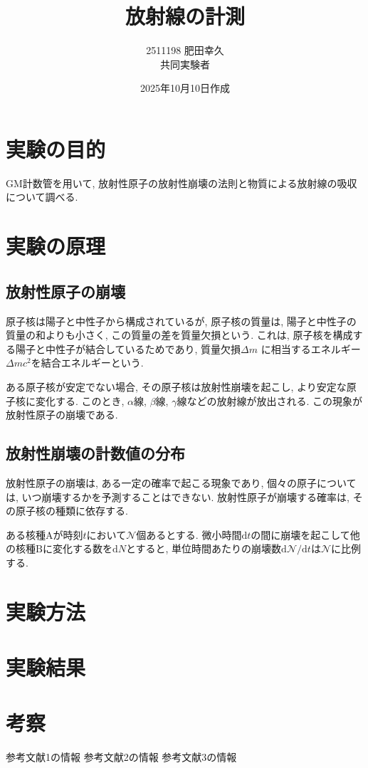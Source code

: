 \documentclass{jarticle}
\title{放射線の計測}
\author{2511198 肥田幸久 \\ 共同実験者 \\ }
\date{2025年10月10日作成}
\begin{document}
\maketitle


\section{実験の目的}

GM計数管を用いて, 放射性原子の放射性崩壊の法則と物質による放射線の吸収について調べる.


\section{実験の原理}

\subsection{放射性原子の崩壊}

原子核は陽子と中性子から構成されているが, 原子核の質量は, 陽子と中性子の質量の和よりも小さく, この質量の差を質量欠損という.
これは, 原子核を構成する陽子と中性子が結合しているためであり, 質量欠損$\Delta m$ に相当するエネルギー$\Delta mc^2$を結合エネルギーという.

ある原子核が安定でない場合, その原子核は放射性崩壊を起こし, より安定な原子核に変化する.
このとき, $\alpha$線, $\beta$線, $\gamma$線などの放射線が放出される.
この現象が放射性原子の崩壊である.

\subsection{放射性崩壊の計数値の分布}

放射性原子の崩壊は, ある一定の確率で起こる現象であり, 個々の原子については, いつ崩壊するかを予測することはできない.
放射性原子が崩壊する確率は, その原子核の種類に依存する.

ある核種$\mathrm{A}$が時刻$t$において$\mathcal{N}$個あるとする.
微小時間$\mathrm{d}t$の間に崩壊を起こして他の核種$\mathrm{B}$に変化する数を$\mathrm{d}N$とすると, 単位時間あたりの崩壊数$\mathrm{d}\mathcal{N}/\mathrm{d}t$は$\mathcal{N}$に比例する.

\section{実験方法}


\section{実験結果}


\section{考察}



\begin{thebibliography}{99}

   参考文献1の情報
   参考文献2の情報
   参考文献3の情報

\end{thebibliography}
\end{document}
